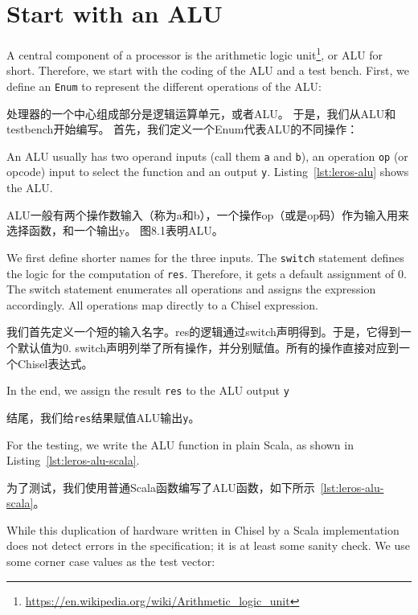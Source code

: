 \documentclass[%
    10pt,
    headinclude, footexclude,
    openright, %
    notitlepage,
    cleardoubleempty,
    headsepline,
    pointlessnumbers,
    bibtotoc, idxtotoc,
    ]{scrbook}
\newcommand{\code}[1]{{\small{\texttt{#1}}}}
\newcommand{\todo}[1]{{\emph{TODO: #1}}}
\newcommand{\myref}[2]{\href{#1}{#2}}
\renewcommand{\myref}[2]{{#2}{\footnote{\url{#1}}}}
\renewcommand{\todo}[1]{}
\begin{document}
{\section{Start with an ALU}

A central component of a processor is the
\myref{https://en.wikipedia.org/wiki/Arithmetic_logic_unit}{arithmetic logic unit}, or ALU for short.
Therefore, we start with the coding of the ALU and a test bench.
First, we define an \code{Enum} to represent the different operations of the ALU:

处理器的一个中心组成部分是逻辑运算单元，或者ALU。
于是，我们从ALU和testbench开始编写。
首先，我们定义一个Enum代表ALU的不同操作：


\noindent An ALU usually has two operand inputs (call them \code{a} and \code{b}), an operation \code{op}
(or opcode) input to select the function and an output \code{y}.
Listing~\ref{lst:leros-alu} shows the ALU.

ALU一般有两个操作数输入（称为a和b），一个操作op（或是op码）作为输入用来选择函数，和一个输出y。
图8.1表明ALU。

\todo{draw a nice ALU, see Wikipedia}

We first define shorter names for the three inputs. The \code{switch} statement defines the
logic for the computation of \code{res}. Therefore, it gets a default assignment of 0.
The switch statement enumerates all operations and assigns the expression accordingly.
All operations map directly to a Chisel expression.

我们首先定义一个短的输入名字。res的逻辑通过switch声明得到。于是，它得到一个默认值为0.
switch声明列举了所有操作，并分别赋值。所有的操作直接对应到一个Chisel表达式。

In the end, we assign the result \code{res} to the ALU output \code{y}

结尾，我们给\code{res}结果赋值ALU输出\code{y}。


For the testing, we write the ALU function in plain Scala, as shown in Listing~\ref{lst:leros-alu-scala}.

为了测试，我们使用普通Scala函数编写了ALU函数，如下所示~\ref{lst:leros-alu-scala}。


\noindent While this duplication of hardware written in Chisel by a Scala implementation does not
detect errors in the specification; it is at least some sanity check.
We use some corner case values as the test vector:

}
\end{document}
